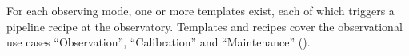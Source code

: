 \begin{center}
\begin{tabular}{|P{0.12\textwidth}|c|c|P{0.12\textwidth}|c|c|c|l|}
  \end{tabular}
\end{center}

For each observing mode, one or more templates exist, each of which
triggers a pipeline recipe at the observatory. Templates and recipes
cover the observational use cases ``Observation'', ``Calibration'' and
``Maintenance'' ().


